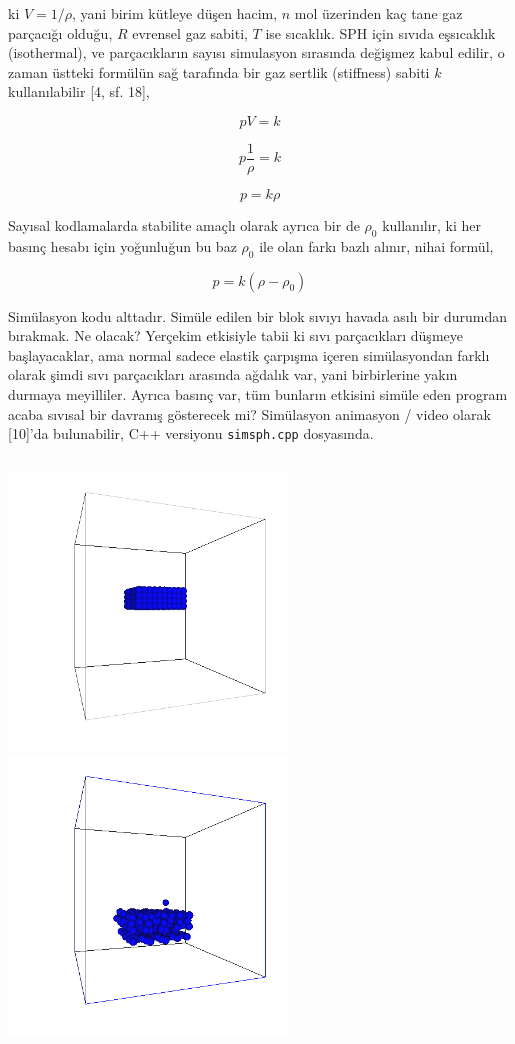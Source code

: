 \documentclass[12pt,fleqn]{article}\usepackage{../../common}
\begin{document}
ki $V = 1 / \rho$, yani birim kütleye düşen hacim, $n$ mol üzerinden kaç tane
gaz parçacığı olduğu, $R$ evrensel gaz sabiti, $T$ ise sıcaklık. SPH için sıvıda
eşsıcaklık (isothermal), ve parçacıkların sayısı simulasyon sırasında değişmez
kabul edilir, o zaman üstteki formülün sağ tarafında bir gaz sertlik (stiffness)
sabiti $k$ kullanılabilir [4, sf. 18], 

$$
p V = k
$$

$$
p \frac{1}{\rho} = k
$$

$$
p  = k \rho
$$

Sayısal kodlamalarda stabilite amaçlı olarak ayrıca bir de $\rho_0$ kullanılır,
ki her basınç hesabı için yoğunluğun bu baz $\rho_0$ ile olan farkı bazlı
alınır, nihai formül,

$$
p  = k (\rho - \rho_0)
$$

Simülasyon kodu alttadır. Simüle edilen bir blok sıvıyı havada asılı bir
durumdan bırakmak. Ne olacak? Yerçekim etkisiyle tabii ki sıvı parçacıkları
düşmeye başlayacaklar, ama normal sadece elastik çarpışma içeren simülasyondan
farklı olarak şimdi sıvı parçacıkları arasında ağdalık var, yani birbirlerine
yakın durmaya meyilliler. Ayrıca basınç var, tüm bunların etkisini simüle eden
program acaba sıvısal bir davranış gösterecek mi? Simülasyon animasyon / video
olarak [10]'da bulunabilir, C++ versiyonu \verb!simsph.cpp! dosyasında.

\inputminted[fontsize=\footnotesize]{python}{simsph.py}

\includegraphics[width=20em]{glutout-002.png}
\includegraphics[width=20em]{glutout-004.png}
\end{document}
